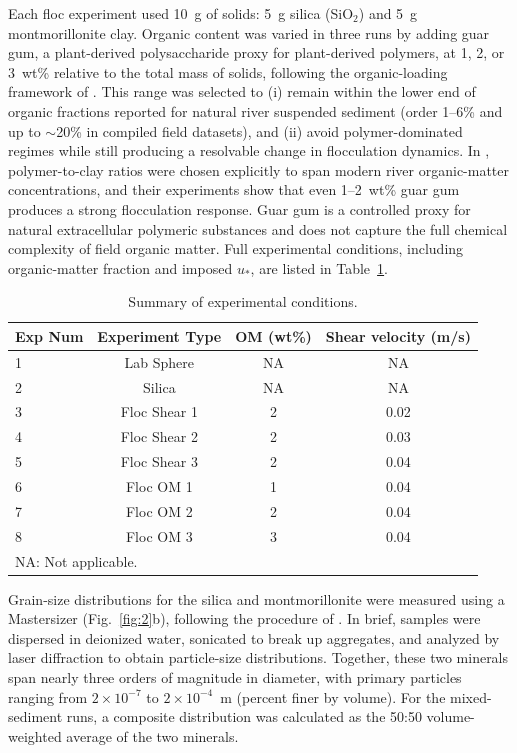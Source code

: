 \documentclass{agujournal2019}
\providecommand{\DIFadd}[1]{{\protect\color{blue}#1}}
\begin{document}
Each floc experiment used 10~g of solids: 5~g silica (SiO$_2$) and 5~g montmorillonite clay. Organic content was varied in three runs by adding guar gum, a plant-derived polysaccharide proxy for plant-derived polymers, at 1, 2, or 3~wt\% relative to the total mass of solids, following the organic-loading framework of . \DIFadd{This range was selected to (i) remain within the lower end of organic fractions reported for natural river suspended sediment (order 1--6\% and up to \(\sim\)20\% in compiled field datasets), and (ii) avoid polymer-dominated regimes while still producing a resolvable change in flocculation dynamics. In \citeA{zeichner2021early}, polymer-to-clay ratios were chosen explicitly to span modern river organic-matter concentrations, and their experiments show that even 1--2~wt\% guar gum produces a strong flocculation response.} \DIFadd{Guar gum is a controlled proxy for natural extracellular polymeric substances and does not capture the full chemical complexity of field organic matter.} Full experimental conditions, including organic-matter fraction and imposed $u_\ast$, are listed in Table~\ref{tab:exp_conditions}.

\begin{table}[htbp]
\caption{Summary of experimental conditions.\label{tab:exp_conditions}}
\centering
\begin{tabular}{lccc}
\hline
Exp Num & Experiment Type & OM (wt\%) & Shear velocity (m/s) \\
\hline
1 & Lab Sphere     & NA    & NA    \\
2 & Silica         & NA    & NA    \\
3 & Floc Shear 1   & 2     & 0.02  \\
4 & Floc Shear 2   & 2     & 0.03  \\
5 & Floc Shear 3   & 2     & 0.04  \\
6 & Floc OM 1     & 1     & 0.04  \\
7 & Floc OM 2     & 2     & 0.04  \\
8 & Floc OM 3     & 3     & 0.04  \\
\hline
\multicolumn{4}{l}{NA: Not applicable.}
\end{tabular}
\end{table}

Grain-size distributions for the silica and montmorillonite were measured using a Mastersizer (Fig.~\ref{fig:2}b), following the procedure of . In brief, samples were dispersed in deionized water, sonicated to break up aggregates, and analyzed by laser diffraction to obtain particle-size distributions. Together, these two minerals span nearly three orders of magnitude in diameter, with primary particles ranging from $2 \times 10^{-7}$ to $2 \times 10^{-4}$~m (percent finer by volume). For the mixed-sediment runs, a composite distribution was calculated as the 50:50 volume-weighted average of the two minerals.
\end{document}
